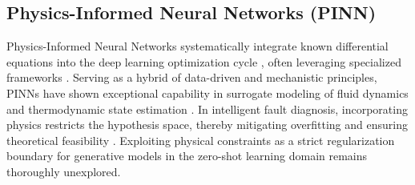 \subsection{Physics-Informed Neural Networks (PINN)}
Physics-Informed Neural Networks systematically integrate known differential equations into the deep learning optimization cycle \cite{raissi2019physics}, often leveraging specialized frameworks \cite{lu2021deepxde}. Serving as a hybrid of data-driven and mechanistic principles, PINNs have shown exceptional capability in surrogate modeling of fluid dynamics and thermodynamic state estimation \cite{chen2021physics}. In intelligent fault diagnosis, incorporating physics restricts the hypothesis space, thereby mitigating overfitting and ensuring theoretical feasibility \cite{yucesan2022hybrid}. Exploiting physical constraints as a strict regularization boundary for generative models in the zero-shot learning domain remains thoroughly unexplored.